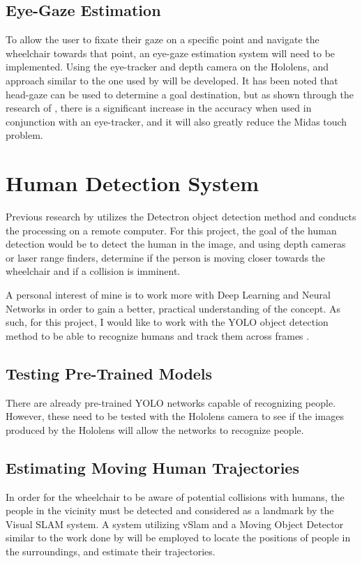 \documentclass[12pt,a4paper]{report}
\begin{document}
\subsection{Eye-Gaze Estimation}
To allow the user to fixate their gaze on a specific point and navigate the wheelchair towards that point, an eye-gaze estimation system will need to be implemented. Using the eye-tracker and depth camera on the Hololens, and approach similar to the one used by \cite{Raymond2018} will be developed. It has been noted that head-gaze can be used to determine a goal destination, but as shown through the research of \cite{VanderMeulen2017}, there is a significant increase in the accuracy when used in conjunction with an eye-tracker, and it will also greatly reduce the Midas touch problem.

\section{Human Detection System} \label{section:HDS}
Previous research by \cite{Chacon-Quesada} utilizes the Detectron object detection method \citep{Detectron2018} and conducts the processing on a remote computer. For this project, the goal of the human detection would be to detect the human in the image, and using depth cameras or laser range finders, determine if the person is moving closer towards the wheelchair and if a collision is imminent.

A personal interest of mine is to work more with Deep Learning and Neural Networks in order to gain a better, practical understanding of the concept. As such, for this project, I would like to work with the YOLO object detection method to be able to recognize humans and track them across frames \citep{Shinde2018, Redmon2015}.

\subsection{Testing Pre-Trained Models}
There are already pre-trained YOLO networks capable of recognizing people. However, these need to be tested with the Hololens camera to see if the images produced by the Hololens will allow the networks to recognize people.

\subsection{Estimating Moving Human Trajectories}
In order for the wheelchair to be aware of potential collisions with humans, the people in the vicinity must be detected and considered as a landmark by the Visual SLAM system. A system utilizing vSlam and a Moving Object Detector similar to the work done by \cite{Wang2011} will be employed to locate the positions of people in the surroundings, and estimate their trajectories.
\end{document}
